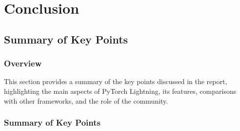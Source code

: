 \documentclass[12pt]{article}
\begin{document}
\section{Conclusion}

\subsection{Summary of Key Points}

\subsubsection{Overview}

This section provides a summary of the key points discussed in the report, highlighting the main aspects of PyTorch Lightning, its features, comparisons with other frameworks, and the role of the community.

\subsubsection{Summary of Key Points}
\end{document}

